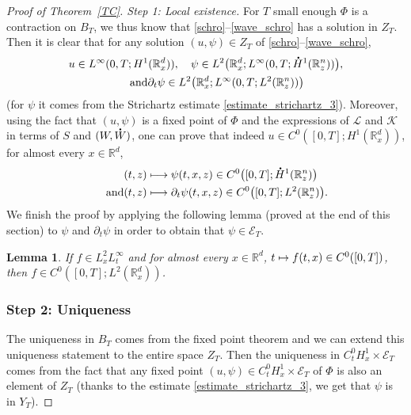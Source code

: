 \documentclass[JEP,XML,SOM,NoEqCountersInSection,NoFloatCountersInSection,Unicode,published]{cedram}
\newcommand\mto{\mathchoice{\longmapsto}{\mapsto}{\mapsto}{\mapsto}}
\newtheorem{lemma}{Lemma}[section]
\theoremstyle{definition}
\newcommand*{\overbigdot}[1]{%
\accentset{\mbox{\large\bfseries .}}{#1}}
\newenvironment{ProofOf}[1]{\begin{proof}[Proof of #1]}{\end{proof}}
\newcommand{\R}{\mathbb{R}}
\begin{document}
\begin{ProofOf}{Theorem~\ref{TC}. Step 1: Local existence} For $T$ small enough $\Phi$ is a contraction on $B_{T}$, we thus know that \eqref{schro}--\eqref{wave_schro} has a solution in $Z_{T}$. Then it is clear that for any solution $(u,\psi)\in Z_{T}$ of \eqref{schro}--\eqref{wave_schro},
\begin{gather*}
u\in L^{\infty}(0,T;H^{1}(\R_{x}^{d})),\quad \psi\in L^{2}\bigl(\R_{x}^{d};L^{\infty}(0,T;\overbigdot{H}^{1}(\R_{z}^{n}))\bigr),\\
\tag*{and} \partial_{t}\psi\in L^{2}\bigl(\R_{x}^{d};L^{\infty}(0,T;L^{2}(\R_{z}^{n}))\bigr)
\end{gather*}
(for $\psi$ it comes from the Strichartz estimate \eqref{estimate_strichartz_3}). Moreover, using the fact that $(u,\psi)$ is a fixed point of $\Phi$ and the expressions of $\mathcal{L}$ and $\mathcal{K}$ in terms of $S$ and $(W,\overbigdot{W})$, one can prove that indeed $u\in C^{0}\left([0,T];H^{1}(\R_{x}^{d})\right)$, for almost every $x\in\R^{d}$,\vspace*{-3pt}
\begin{align*}
(t,z)&\mto \psi(t,x,z)\in C^{0}\bigl([0,T];\overbigdot{H}^{1}(\R_{z}^{n})\bigr)\\
\tag*{and}
(t,z)&\mto\partial_{t}\psi(t,x,z)\in C^{0}\bigl([0,T];L^{2}(\R_{z}^{n})\bigr).
\end{align*}
We finish the proof by applying the following lemma (proved at the end of this section) to $\psi$ and $\partial_{t}\psi$ in order to obtain that $\psi\in\mathcal{E}_{T}$.
\begin{lemma}\label{lemma_continuity}
If $f\in L_{x}^{2}L_{t}^{\infty}$ and for almost every $x\in\R^{d}$, $t\mto f(t,x)\in C^{0}([0,T])$, then $f\in C^{0}\left([0,T];L^{2}(\R_{x}^{d})\right)$.
\end{lemma}

\subsubsection*{Step 2: Uniqueness} The uniqueness in $B_{T}$ comes from the fixed point theorem and we can extend this uniqueness statement to the entire space $Z_{T}$. Then the uniqueness in $C_{t}^{0}H_{x}^{1}\times\mathcal{E}_{T}$ comes from the fact that any fixed point $(u,\psi)\in C_{t}^{0}H_{x}^{1}\times\mathcal{E}_{T}$ of $\Phi$ is also an element of $Z_{T}$ (thanks to the estimate \eqref{estimate_strichartz_3}, we get that $\psi$ is in $Y_{T}$).


\end{ProofOf}
\end{document}
